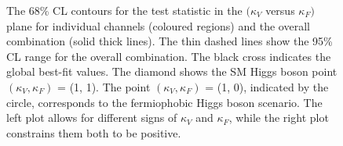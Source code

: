 \documentclass[11pt,twoside,a4paper,cmspaper,final,collab]{cms-tdr}
\begin{document}
\begin{figure}
\centering
{} \hfill
{}
\caption{
The 68\% CL contours for the test statistic in the $(\kappa_V$ versus
$\kappa_F)$ plane for individual channels (coloured regions) and the
overall combination (solid thick lines).
The thin dashed lines show the 95\% CL range for the overall combination.
The black cross indicates the global best-fit values. The diamond shows the SM Higgs boson
point $(\kappa_V, \kappa_F)$ = (1, 1).
The point $(\kappa_V, \kappa_F)$ = (1, 0), indicated by the circle, corresponds to the fermiophobic Higgs boson scenario.
The left plot allows for different signs of $\kappa_V$ and $\kappa_F$, while the
right plot constrains them both to be positive.
}
\label{fig:cVcF_subchannels}
\end{figure}
\end{document}
